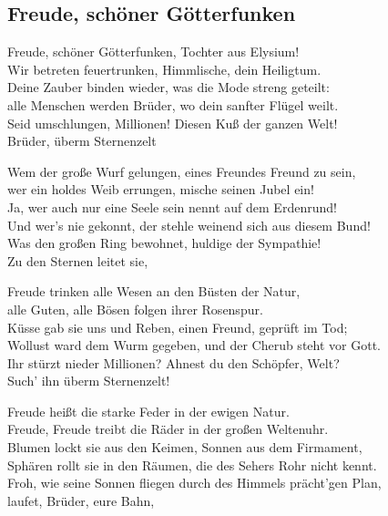 
\subsection*{Freude, schöner Götterfunken}
%

\thestrophe Freude, schöner Götterfunken, Tochter aus Elysium! \\
Wir betreten feuertrunken, Himmlische, dein Heiligtum. \\
Deine Zauber binden wieder, was die Mode streng geteilt: \\
alle Menschen werden Brüder, wo dein sanfter Flügel weilt. \\
Seid umschlungen, Millionen! Diesen Kuß der ganzen Welt! \\
Brüder, überm Sternenzelt

\thestrophe Wem der große Wurf gelungen, eines Freundes Freund zu sein, \\
wer ein holdes Weib errungen, mische seinen Jubel ein! \\
Ja, wer auch nur eine Seele sein nennt auf dem Erdenrund! \\
Und wer's nie gekonnt, der stehle weinend sich aus diesem Bund! \\
Was den großen Ring bewohnet, huldige der Sympathie! \\
Zu den Sternen leitet sie,

\thestrophe Freude trinken alle Wesen an den Büsten der Natur, \\
alle Guten, alle Bösen folgen ihrer Rosenspur. \\
Küsse gab sie uns und Reben, einen Freund, geprüft im Tod; \\
Wollust ward dem Wurm gegeben, und der Cherub steht vor Gott. \\
Ihr stürzt nieder Millionen? Ahnest du den Schöpfer, Welt? \\
Such' ihn überm Sternenzelt!

\thestrophe Freude heißt die starke Feder in der ewigen Natur. \\
Freude, Freude treibt die Räder in der großen Weltenuhr. \\
Blumen lockt sie aus den Keimen, Sonnen aus dem Firmament, \\
Sphären rollt sie in den Räumen, die des Sehers Rohr nicht kennt. \\
Froh, wie seine Sonnen fliegen durch des Himmels prächt'gen Plan, \\
laufet, Brüder, eure Bahn,

